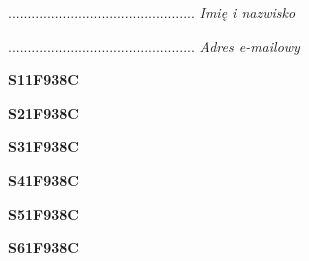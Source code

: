 \begin{turn}{90}\begin{minipage}{\linewidth} \vspace{20mm} ................................................  \textit{Imię i nazwisko}\end{minipage}\end{turn}

\begin{turn}{90}\begin{minipage}{\linewidth} \vspace{20mm} ................................................  \textit{Adres e-mailowy}\end{minipage}\end{turn}

\begin{turn}{90}\huge \begin{minipage}{\linewidth} \vspace{10mm}\textbf{S11F938C}\end{minipage}\end{turn}

\begin{turn}{90}\huge \begin{minipage}{\linewidth} \vspace{10mm}\textbf{S21F938C}\end{minipage}\end{turn}

\begin{turn}{90}\huge \begin{minipage}{\linewidth} \vspace{10mm}\textbf{S31F938C}\end{minipage}\end{turn}

\begin{turn}{90}\huge \begin{minipage}{\linewidth} \vspace{10mm}\textbf{S41F938C}\end{minipage}\end{turn}

\begin{turn}{90}\huge \begin{minipage}{\linewidth} \vspace{10mm}\textbf{S51F938C}\end{minipage}\end{turn}

\begin{turn}{90}\huge \begin{minipage}{\linewidth} \vspace{10mm}\textbf{S61F938C}\end{minipage}\end{turn}

